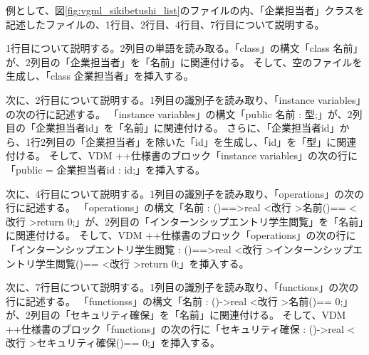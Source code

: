 例として、図\ref{fig:vgml_sikibetushi_list}のファイルの内、「企業担当者」クラスを記述したファイルの、1行目、2行目、4行目、7行目について説明する。

1行目について説明する。2列目の単語を読み取る。「class」の構文「class 名前」が、2列目の「企業担当者」を「名前」に関連付ける。
そして、空のファイルを生成し、「class 企業担当者」を挿入する。

次に、2行目について説明する。1列目の識別子を読み取り、「instance variables」の次の行に記述する。
「instance variables」の構文「public 名前 : 型;」が、2列目の「企業担当者id」を「名前」に関連付ける。
さらに、「企業担当者id」から、1行2列目の「企業担当者」を除いた「id」を生成し、「id」を「型」に関連付ける。
そして、VDM ++仕様書のブロック「instance variables」の次の行に「public  = 企業担当者id : id;」を挿入する。

次に、4行目について説明する。1列目の識別子を読み取り、「operations」の次の行に記述する。
「operations」の構文「名前 : ()==\textgreater real \textless 改行 \textgreater 名前()== \textless 改行 \textgreater return 0;」が、2列目の「インターンシップエントリ学生閲覧」を「名前」に関連付ける。
そして、VDM ++仕様書のブロック「operations」の次の行に「インターンシップエントリ学生閲覧 : ()==\textgreater real \textless 改行 \textgreater インターンシップエントリ学生閲覧()== \textless 改行 \textgreater return 0;」を挿入する。

次に、7行目について説明する。1列目の識別子を読み取り、「functions」の次の行に記述する。
「functionss」の構文「名前 : ()-\textgreater real \textless 改行 \textgreater 名前()== 0;」が、2列目の「セキュリティ確保」を「名前」に関連付ける。
そして、VDM ++仕様書のブロック「functions」の次の行に「セキュリティ確保 : ()-\textgreater real \textless 改行 \textgreater セキュリティ確保()== 0;」を挿入する。